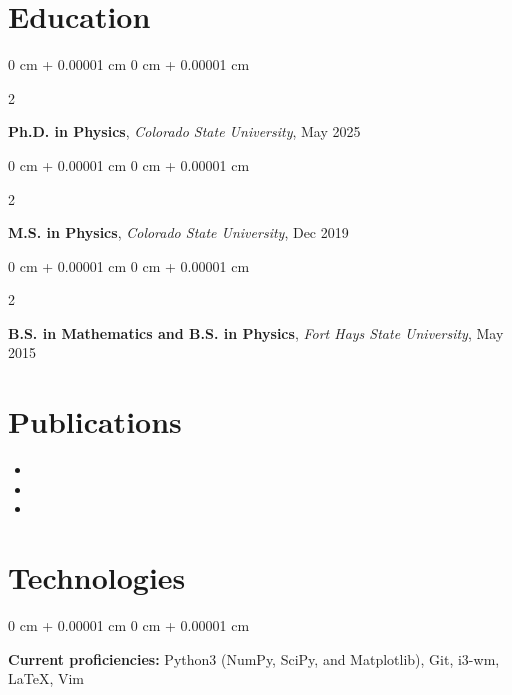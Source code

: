 \documentclass[10pt, letterpaper]{article}
\newenvironment{highlights}{
    \begin{itemize}[
        topsep=0.10 cm,
        parsep=0.10 cm,
        partopsep=0pt,
        itemsep=0pt,
        leftmargin=0 cm + 10pt
    ]
}{
    \end{itemize}
} %
\newenvironment{onecolentry}{
    \begin{adjustwidth}{
        0 cm + 0.00001 cm
    }{
        0 cm + 0.00001 cm
    }
}{
    \end{adjustwidth}
} %
\newenvironment{twocolentry}[2][]{
    \onecolentry
    \def\secondColumn{#2}
    \setcolumnwidth{\fill, 4.5 cm}
    \begin{paracol}{2}
}{
    \switchcolumn \raggedleft \secondColumn
    \end{paracol}
    \endonecolentry
} %
\begin{document}
    \section{Education}

        \begin{twocolentry}{
            May 2025
        }
        \textbf{Ph.D. in Physics}, \textit{Colorado State University},  \end{twocolentry}

        \vspace{0.10 cm}

        \begin{twocolentry}{
            Dec 2019
        }
        \textbf{M.S. in Physics}, \textit{Colorado State University},  \end{twocolentry}

        \vspace{0.10 cm}

        \begin{twocolentry}{
            May 2015
        }
        \textbf{B.S. in Mathematics and B.S. in Physics}, \textit{Fort Hays State University},  \end{twocolentry}

        \vspace{0.10 cm}

    \section{Publications}

        \begin{onecolumnentry}
          \begin{highlights}
            \item {}
            \item {}
            \item {}
          \end{highlights}
        \end{onecolumnentry}

    \section{Technologies}

        \begin{onecolentry}
          \textbf{Current proficiencies:} Python3 (NumPy, SciPy, and Matplotlib), Git, i3-wm, \LaTeX,  Vim
        \end{onecolentry}
\end{document}
